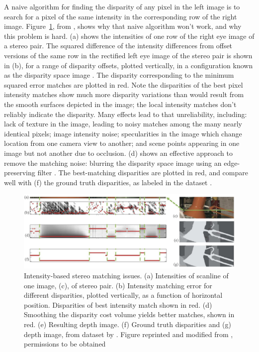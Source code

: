 A naive algorithm for finding the disparity of any pixel in the left image is to search for a pixel of the same intensity  in the corresponding row of the right image.  Figure~\ref{fig:stereolamp}, from \cite{Hosni2013}, shows why that naive algorithm won't work, and why this problem is hard.  (a) shows the intensities of one row of the right eye image of a stereo pair. The squared difference of the intensity differences from offset versions of the same row in the rectified left eye image of the stereo pair is shown in (b), for a range of disparity offsets, plotted vertically, in a configuration known as the disparity space image \cite{Scharstein2002}.  The disparity corresponding to the minimum squared error matches are plotted in red.  Note the disparities of the best pixel intensity matches show much more disparity variations than would result from the smooth surfaces depicted in the image; the local intensity matches don't reliably indicate the disparity.  Many effects lead to that unreliability, including: lack of texture in the image, leading to noisy matches among the many nearly identical pixels; image intensity noise; specularities in the image which change location from one camera view to another; and scene points appearing in one image but not another due to occlusion. (d) shows an effective approach to remove the matching noise:  blurring the disparity space image using an edge-preserving filter \cite{Hosni2013}.  The best-matching disparities are plotted in red, and compare well with (f) the ground truth disparities, as labeled in the dataset \cite{Scharstein2002}.

\begin{figure}
\centerline{
\includegraphics[width=0.9\linewidth]{figures/stereo/stereolamp.jpg}}
\caption{Intensity-based stereo matching issues. (a) Intensities of scanline of one image, (c), of stereo pair. (b) Intensity matching error for different disparities, plotted vertically, as a function of horizontal position.  Disparities of best intensity match shown in red. (d) Smoothing the disparity cost volume yields better matches, shown in red. (e) Resulting depth image.  (f) Ground truth disparities and (g) depth image, from dataset by  \cite{Scharstein2002}. Figure reprinted and modified from \cite{Hosni2013}, permissions to be obtained}
\label{fig:stereolamp}
\end{figure}

